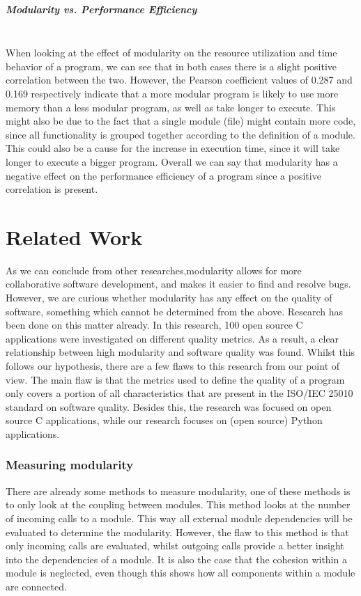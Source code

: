 \documentclass[twoside]{uva-inf-bachelor-thesis}
\newcommand{\myparagraph}[1]{\paragraph{#1}\mbox{}\\}
\begin{document}
\myparagraph{Modularity vs. Performance Efficiency}
When looking at the effect of modularity on the resource utilization and time behavior of a program, we can see that in both cases there is a slight positive correlation between the two. However, the Pearson coefficient values of 0.287 and 0.169 respectively indicate that a more modular program is likely to use more memory than a less modular program, as well as take longer to execute. This might also be due to the fact that a single module (file) might contain more code, since all functionality is grouped together according to the definition of a module. This could also be a cause for the increase in execution time, since it will take longer to execute a bigger program. Overall we can say that modularity has a negative effect on the performance efficiency of a program since a positive correlation is present. 

\chapter{Related Work}
As we can conclude from other researches\cite{LinuxKernel,lee2000linux},modularity allows for more collaborative software development, and makes it easier to find and resolve bugs. However, we are curious whether modularity has any effect on the quality of software, something which cannot be determined from the above. Research has been done on this matter already\cite{stamelos2002code}. In this research, 100 open source C applications were investigated on different quality metrics. As a result, a clear relationship between high modularity and software quality was found. Whilst this follows our hypothesis, there are a few flaws to this research from our point of view. The main flaw is that the metrics used to define the quality of a program only covers a portion of all characteristics that are present in the ISO/IEC 25010 standard on software quality\cite{ISO25010}. Besides this, the research was focused on open source C applications, while our research focuses on (open source) Python applications.

\subsection*{Measuring modularity}
There are already some methods to measure modularity, one of these methods is to only look at the coupling between modules\cite{BetterCodeHub,visser2016building}. This method looks at the number of incoming calls to a module. This way all external module dependencies will be evaluated to determine the modularity. However, the flaw to this method is that only incoming calls are evaluated, whilst outgoing calls provide a better insight into the dependencies of a module. It is also the case that the cohesion within a module is neglected, even though this shows how all components within a module are connected.
\end{document}
